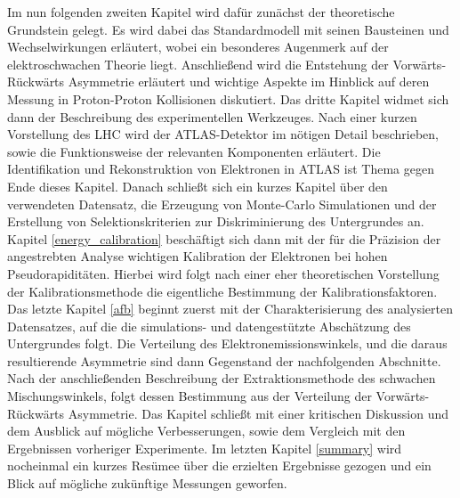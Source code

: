 Im nun folgenden zweiten Kapitel wird dafür zunächst der theoretische
Grundstein gelegt. Es wird dabei das Standardmodell mit seinen Bausteinen und
Wechselwirkungen erläutert, wobei ein besonderes Augenmerk auf der
elektroschwachen Theorie liegt. Anschließend wird die Entstehung der
Vorwärts-Rückwärts Asymmetrie erläutert und wichtige Aspekte im Hinblick auf
deren Messung in Proton-Proton Kollisionen diskutiert. Das dritte Kapitel
widmet sich dann der Beschreibung des experimentellen Werkzeuges. Nach einer
kurzen Vorstellung des \acf{LHC} wird der ATLAS-Detektor im nötigen Detail
beschrieben, sowie die Funktionsweise der relevanten Komponenten erläutert.
Die Identifikation und Rekonstruktion von Elektronen in ATLAS ist Thema gegen
Ende dieses Kapitel. Danach schließt sich ein kurzes Kapitel über den
verwendeten Datensatz, die Erzeugung von Monte-Carlo Simulationen und der
Erstellung von Selektionskriterien zur Diskriminierung des Untergrundes an.
Kapitel \ref{energy_calibration} beschäftigt sich dann mit der für die
Präzision der angestrebten Analyse wichtigen Kalibration der Elektronen bei
hohen Pseudorapiditäten. Hierbei wird folgt nach einer eher theoretischen
Vorstellung der Kalibrationsmethode die eigentliche Bestimmung der
Kalibrationsfaktoren. Das letzte Kapitel \ref{afb} beginnt zuerst mit der
Charakterisierung des analysierten Datensatzes, auf die die simulations- und
datengestützte Abschätzung des Untergrundes folgt. Die Verteilung des
Elektron\-emissionswinkels, und die daraus resultierende Asymmetrie sind dann
Gegenstand der nachfolgenden Abschnitte. Nach der anschließenden Beschreibung
der Extraktionsmethode des schwachen Mischungswinkels, folgt dessen Bestimmung
aus der Verteilung der Vorwärts-Rückwärts Asymmetrie. Das Kapitel schließt mit
einer kritischen Diskussion und dem Ausblick auf mögliche Verbesserungen, sowie
dem Vergleich mit den Ergebnissen vorheriger Experimente. Im letzten Kapitel
\ref{summary} wird nocheinmal ein kurzes Resümee über die erzielten
Ergebnisse gezogen und ein Blick auf mögliche zukünftige Messungen geworfen.

